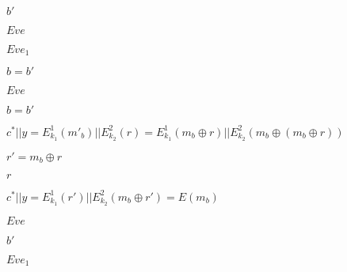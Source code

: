 \documentclass[10pt]{book}
\begin{document}
\begin{mdSnippets}
\begin{mdInlineSnippet}[2765802181072b3aa2be59dae8c72b0d]
$b'$\end{mdInlineSnippet}%
\begin{mdInlineSnippet}%
$Eve$\end{mdInlineSnippet}%
\begin{mdInlineSnippet}[ea523dcecb615397b9b49384b789218b]%
$Eve_1$\end{mdInlineSnippet}%
\begin{mdInlineSnippet}[2b6e49448e7d732421cbac8655e4f76a]%
$b = b'$\end{mdInlineSnippet}%
\begin{mdInlineSnippet}%
$Eve$\end{mdInlineSnippet}%
\begin{mdInlineSnippet}[2b6e49448e7d732421cbac8655e4f76a]%
$b = b'$\end{mdInlineSnippet}%
\begin{mdInlineSnippet}[7a3ebf308536970641a072e9cc456aa3]%
$c^* || y = E^1_{k_1}(m'_b) || E_{k_2}^2(r) = E^1_{k_1}(m_b \oplus r) || E_{k_2}^2(m_b \oplus (m_b \oplus r))$\end{mdInlineSnippet}%
\begin{mdInlineSnippet}%
$r' = m_b \oplus r$\end{mdInlineSnippet}%
\begin{mdInlineSnippet}[4b43b0aee35624cd95b910189b3dc231]%
$r$\end{mdInlineSnippet}%
\begin{mdInlineSnippet}[c70785d5f5574beeaf3272296a731cd9]%
$c^* || y = E^1_{k_1}(r') || E^2_{k_2}(m_b \oplus r') = E(m_b)$\end{mdInlineSnippet}%
\begin{mdInlineSnippet}%
$Eve$\end{mdInlineSnippet}%
\begin{mdInlineSnippet}[2765802181072b3aa2be59dae8c72b0d]%
$b'$\end{mdInlineSnippet}%
\begin{mdInlineSnippet}[ea523dcecb615397b9b49384b789218b]%
$Eve_1$\end{mdInlineSnippet}%

\end{mdSnippets}
\end{document}
